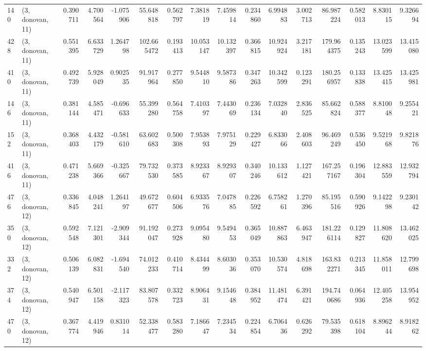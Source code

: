 \begin{tabular}{llrrrrrrrrrrrrrr}
140 &  (3, donovan, 11) &   0.390711 &   4.700564 &  -1.075906 &    55.648818 &   0.562797 &   7.381819 &   7.459814 &  0.234860 &   6.994883 &   3.002713 &    86.987224 &   0.582013 &   8.830115 &   9.326694 \\
428 &  (3, donovan, 11) &   0.551395 &   6.633729 &   1.264798 &   102.665472 &   0.193413 &  10.053147 &  10.132397 &  0.366815 &  10.924924 &   3.217181 &   179.964375 &   0.135243 &  13.023599 &  13.415080 \\
410 &  (3, donovan, 11) &   0.492739 &   5.928049 &   0.902535 &    91.917964 &   0.277850 &   9.544810 &   9.587386 &  0.347263 &  10.342599 &   0.123291 &   180.256957 &   0.133838 &  13.425415 &  13.425981 \\
146 &  (3, donovan, 11) &   0.381144 &   4.585471 &  -0.696633 &    55.399280 &   0.564758 &   7.410397 &   7.443069 &  0.236134 &   7.032840 &   2.836525 &    85.662824 &   0.588377 &   8.810048 &   9.255421 \\
152 &  (3, donovan, 11) &   0.368403 &   4.432179 &  -0.581610 &    63.602683 &   0.500308 &   7.953893 &   7.975129 &  0.229427 &   6.833066 &   2.408603 &    96.469249 &   0.536450 &   9.521968 &   9.821876 \\
416 &  (3, donovan, 11) &   0.471238 &   5.669366 &  -0.325667 &    79.732530 &   0.373585 &   8.923367 &   8.929307 &  0.340246 &  10.133612 &   1.127421 &   167.257167 &   0.196304 &  12.883559 &  12.932794 \\
476 &  (3, donovan, 12) &   0.336845 &   4.048241 &   1.264197 &    49.672677 &   0.604506 &   6.933576 &   7.047885 &  0.226592 &   6.758261 &   1.270396 &    85.195516 &   0.590926 &   9.142298 &   9.230142 \\
350 &  (3, donovan, 12) &   0.592548 &   7.121301 &  -2.909344 &    91.192047 &   0.273928 &   9.095480 &   9.549453 &  0.365049 &  10.887863 &   6.463947 &   181.226114 &   0.129827 &  11.808620 &  13.462025 \\
332 &  (3, donovan, 12) &   0.506139 &   6.082831 &  -1.694540 &    74.012233 &   0.410714 &   8.434499 &   8.603036 &  0.353070 &  10.530574 &   4.818698 &   163.832271 &   0.213345 &  11.858011 &  12.799698 \\
374 &  (3, donovan, 12) &   0.540947 &   6.501158 &  -2.117323 &    83.807578 &   0.332723 &   8.906431 &   9.154648 &  0.384952 &  11.481474 &   6.391421 &   194.740686 &   0.064936 &  12.405258 &  13.954952 \\
470 &  (3, donovan, 12) &   0.367774 &   4.419946 &   0.831014 &    52.338477 &   0.583280 &   7.186647 &   7.234534 &  0.224854 &   6.706436 &   0.626292 &    79.535398 &   0.618104 &   8.896244 &   8.918262 \\

\end{tabular}
